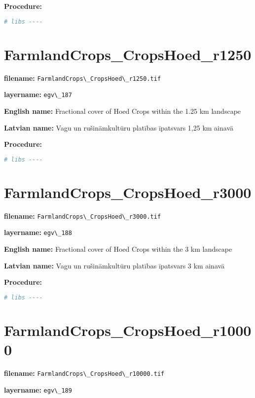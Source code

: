 \documentclass[
]{book}
\newcommand{\passthrough}[1]{#1}
\begin{document}
\textbf{Procedure:}

\begin{lstlisting}[language=R]
# libs ----
\end{lstlisting}

\section{FarmlandCrops\_CropsHoed\_r1250}\label{ch06.187}

\textbf{filename:} \passthrough{\lstinline!FarmlandCrops\_CropsHoed\_r1250.tif!}

\textbf{layername:} \passthrough{\lstinline!egv\_187!}

\textbf{English name:} Fractional cover of Hoed Crops within the 1.25 km landscape

\textbf{Latvian name:} Vagu un rušināmkultūru platības īpatsvars 1,25 km ainavā

\textbf{Procedure:}

\begin{lstlisting}[language=R]
# libs ----
\end{lstlisting}

\section{FarmlandCrops\_CropsHoed\_r3000}\label{ch06.188}

\textbf{filename:} \passthrough{\lstinline!FarmlandCrops\_CropsHoed\_r3000.tif!}

\textbf{layername:} \passthrough{\lstinline!egv\_188!}

\textbf{English name:} Fractional cover of Hoed Crops within the 3 km landscape

\textbf{Latvian name:} Vagu un rušināmkultūru platības īpatsvars 3 km ainavā

\textbf{Procedure:}

\begin{lstlisting}[language=R]
# libs ----
\end{lstlisting}

\section{FarmlandCrops\_CropsHoed\_r10000}\label{ch06.189}

\textbf{filename:} \passthrough{\lstinline!FarmlandCrops\_CropsHoed\_r10000.tif!}

\textbf{layername:} \passthrough{\lstinline!egv\_189!}
\end{document}

